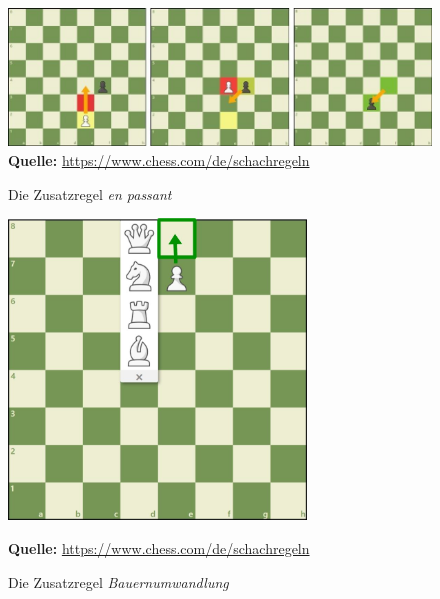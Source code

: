 \documentclass[a4paper,12pt]{report}
\begin{document}
  \begin{figure}[ht]
\raggedleft
  \includegraphics[width=160mm]{en-passant.jpeg}
    \footnotesize\sffamily\textbf{Quelle:} \url{https://www.chess.com/de/schachregeln}
  \caption{Die Zusatzregel \textit{en passant}}
  \label{fig:en-passant}
\end{figure}

  \begin{figure}[ht]
\centering
  \includegraphics[height=80mm]{promotion.jpeg}
   
   
\raggedleft
    \footnotesize\sffamily\textbf{Quelle:} \url{https://www.chess.com/de/schachregeln}
  \caption{Die Zusatzregel \textit{Bauernumwandlung}}
  \label{fig:promotion}
\end{figure}




\end{document}
